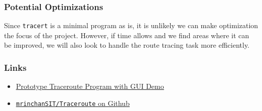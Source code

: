 \documentclass{beamer}
\begin{document}
\begin{frame}
  \frametitle{Potential Optimizations}

  Since \texttt{tracert} is a minimal program as is, it is unlikely we can make optimization the 
  focus of the project. However, if time allows and we find areas where it can be improved,
  we will also look to handle the route tracing task more efficiently.

\end{frame}

\begin{frame}
  \frametitle{Links}

  \begin{itemize}
  \item \href{http://youtu.be/Z2_QqqkHR54}{\underline{Prototype Traceroute Program with GUI Demo}}
  \item \href{http://github.com/mrinchanSIT/Traceroute}{\underline{\texttt{mrinchanSIT/Traceroute} on Github}}
  \end{itemize}
\end{frame}
\end{document}
